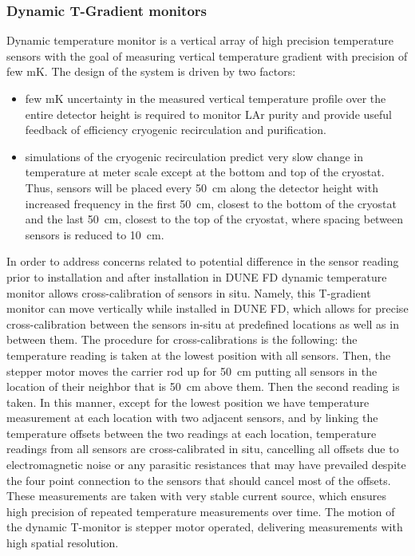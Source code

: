 \subsubsection{Dynamic T-Gradient monitors}

Dynamic temperature monitor is a vertical array of high precision temperature sensors with the goal of measuring vertical temperature gradient with precision of few mK. The design of the system is driven by two factors:
\begin{itemize}
\item
few mK uncertainty in the measured vertical temperature profile over the entire detector height is required to monitor LAr purity and provide useful feedback of efficiency cryogenic recirculation and purification.
\item
simulations of the cryogenic recirculation predict very slow change in temperature at meter scale except at the bottom and top of the cryostat. Thus, sensors will be placed every \SI{50}{cm} along the detector height with increased frequency in the first \SI{50}{cm}, closest to the bottom of the cryostat and the last \SI{50}{cm}, closest to the top of the cryostat, where spacing between sensors is reduced to \SI{10}{cm}.
 \end{itemize}



 In order to address concerns related to potential difference in the sensor reading prior to installation and after installation in DUNE FD dynamic temperature monitor allows cross-calibration of sensors in situ. Namely, this T-gradient monitor  can move vertically while installed in DUNE FD, which allows for precise cross-calibration between the sensors in-situ at predefined locations as well as in between them. The procedure for cross-calibrations is the following: the temperature reading is taken at the lowest position with all sensors. Then, the stepper motor moves the carrier rod up for \SI{50}{cm} putting all sensors in the location of their neighbor that is \SI{50}{cm} above them. Then the second reading is taken. In this manner, except for the lowest position we have temperature measurement at each location with two adjacent sensors, and by linking the temperature offsets between the two readings at each location, temperature readings from all sensors are cross-calibrated in situ, cancelling all offsets due to electromagnetic noise or any parasitic resistances that may have prevailed despite the four point connection to the sensors that should cancel most of the offsets. These measurements are taken with very stable current source, which ensures high precision of repeated temperature measurements over time. The motion of the dynamic T-monitor is stepper motor operated, delivering measurements with high spatial resolution. 

